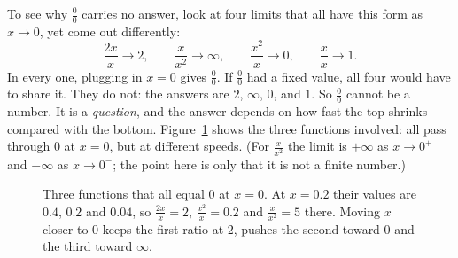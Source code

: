 To see why $\tfrac{0}{0}$ carries no answer, look at four limits that all have this
form as $x\to 0$, yet come out differently:
\[
\frac{2x}{x}\to 2,\qquad
\frac{x}{x^2}\to \infty,\qquad
\frac{x^2}{x}\to 0,\qquad
\frac{x}{x}\to 1.
\]
In every one, plugging in $x=0$ gives $\tfrac{0}{0}$. If $\tfrac{0}{0}$ had a fixed
value, all four would have to share it. They do not: the answers are $2$, $\infty$,
$0$, and $1$. So $\tfrac{0}{0}$ cannot be a number. It is a \emph{question}, and the
answer depends on how fast the top shrinks compared with the bottom.
Figure~\ref{ch18:fig-four-zeros} shows the three functions involved: all pass through
$0$ at $x=0$, but at different speeds. (For $\tfrac{x}{x^2}$ the limit is
$+\infty$ as $x\to 0^+$ and $-\infty$ as $x\to 0^-$; the point here is only that it is
not a finite number.)

\begin{figure}[htbp]
\centering
{}
\caption{Three functions that all equal $0$ at $x=0$. At $x=0.2$ their values are
$0.4$, $0.2$ and $0.04$, so $\tfrac{2x}{x}=2$, $\tfrac{x^2}{x}=0.2$ and
$\tfrac{x}{x^2}=5$ there. Moving $x$ closer to $0$ keeps the first ratio at $2$,
pushes the second toward $0$ and the third toward $\infty$.}
\label{ch18:fig-four-zeros}
\end{figure}

